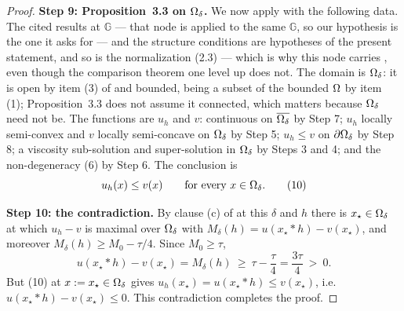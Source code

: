 \begin{proof}
\medskip\noindent\textbf{Step 9: Proposition~3.3 on $\Omega_\delta$.} We now apply
 with the following data. The cited results at
$\mathbb G$ --- that node is applied to the same $\mathbb G$, so our hypothesis is the one it
asks for --- and the structure conditions are hypotheses of the present statement, and so is the
normalization (2.3) --- which is why this node carries , even
though the comparison theorem one level up does not. The domain is $\Omega_\delta$: it is open
by item (3) of  and bounded, being a subset of the bounded
$\Omega$ by item (1); Proposition~3.3 does not assume it connected, which matters because
$\Omega_\delta$ need not be. The functions are $u_h$ and $v$: continuous on
$\overline{\Omega_\delta}$ by Step 7; $u_h$ locally semi-convex and $v$ locally semi-concave on
$\Omega_\delta$ by Step 5; $u_h\le v$ on $\partial\Omega_\delta$ by Step 8; a viscosity sub-solution
and super-solution in $\Omega_\delta$ by Steps 3 and 4; and the non-degeneracy (6) by Step 6.
The conclusion is
\[
 u_h(x)\le v(x)\qquad\text{for every } x\in\Omega_\delta . \tag{10}
\]

\medskip\noindent\textbf{Step 10: the contradiction.} By clause (c) of
 at this $\delta$ and $h$ there is $x_\star\in\Omega_\delta$ at
which $u_h-v$ is maximal over $\Omega_\delta$ with $M_\delta(h)=u(x_\star*h)-v(x_\star)$, and
moreover $M_\delta(h)\ge M_0-\tau/4$. Since $M_0\ge\tau$,
\[
 u(x_\star*h)-v(x_\star)=M_\delta(h)\ \ge\ \tau-\frac\tau4=\frac{3\tau}4\ >\ 0 .
\]
But (10) at $x:=x_\star\in\Omega_\delta$ gives $u_h(x_\star)=u(x_\star*h)\le v(x_\star)$, i.e.
$u(x_\star*h)-v(x_\star)\le0$. This contradiction completes the proof.
\end{proof}
